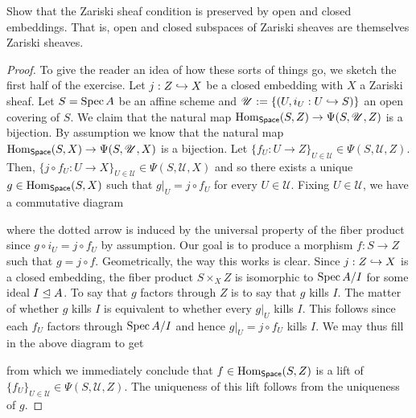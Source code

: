\documentclass[11pt]{article}
\newcommand{\U}{\mathscr{U}}
\begin{document}
\begin{exercise}
Show that the Zariski sheaf condition is preserved by open and closed embeddings. That is, open and closed subspaces of Zariski sheaves are themselves Zariski sheaves.
\end{exercise}

\begin{proof}
To give the reader an idea of how these sorts of things go, we sketch the first half of the exercise. Let $j: Z\hookrightarrow X$ be a closed embedding with $X$ a Zariski sheaf. Let $S=\operatorname{Spec} A$ be an affine scheme and $\U:=\{(U,i_U: U\inj S)\}$ an open covering of $S$. We claim that the natural map $\Hom_{\Space}(S,Z)\to\Psi(S,\U,Z)$ is a bijection. By assumption we know that the natural map $\Hom_{\Space}(S,X)\to\Psi(S,\U,X)$ is a bijection. Let $\{f_U: U\to Z\}_{U\in\U}\in\Psi(S,\U,Z)$. Then, $\{j\circ f_U: U\to X\}_{U\in\U}\in\Psi(S,\U,X)$ and so there exists a unique $g\in\operatorname{Hom}_{\operatorname{\mathsf{Space}}}(S,X)$ such that $g|_U=j\circ f_U$ for every $U\in\U$. Fixing $U\in\U$, we have a commutative diagram
\begin{center}
\end{center}
where the dotted arrow is induced by the universal property of the fiber product since $g\circ i_U=j\circ f_U$ by assumption. Our goal is to produce a morphism $f: S\to Z$ such that $g=j\circ f$. Geometrically, the way this works is clear. Since $j: Z\hookrightarrow X$ is a closed embedding, the fiber product $S\times_XZ$ is isomorphic to $\operatorname{Spec} A/I$ for some ideal $I\trianglelefteq A$. To say that $g$ factors through $Z$ is to say that $g$ kills $I$. The matter of whether $g$ kills $I$ is equivalent to whether every $g|_U$ kills $I$. This follows since each $f_U$ factors through $\operatorname{Spec} A/I$ and hence $g|_U=j\circ f_U$ kills $I$. We may thus fill in the above diagram to get
\begin{center}
\end{center}
from which we immediately conclude that $f\in\operatorname{Hom}_{\operatorname{\mathsf{Space}}}(S,Z)$ is a lift of $\{f_U\}_{U\in\U}\in\Psi(S,\U,Z)$. The uniqueness of this lift follows from the uniqueness of $g$.


\end{proof}
\end{document}
